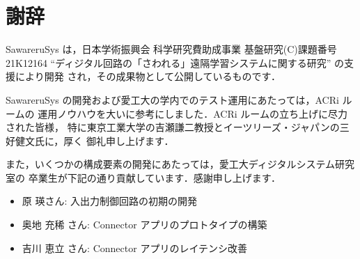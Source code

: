 \chapter*{謝辞}
SawareruSys は，日本学術振興会 科学研究費助成事業 基盤研究(C)課題番号 21K12164 
``ディジタル回路の「さわれる」遠隔学習システムに関する研究'' の支援により開発
され，その成果物として公開しているものです．

SawareruSys の開発および愛工大の学内でのテスト運用にあたっては，ACRi ルームの
運用ノウハウを大いに参考にしました．ACRi ルームの立ち上げに尽力された皆様，
特に東京工業大学の吉瀬謙二教授とイーツリーズ・ジャパンの三好健文氏に，厚く
御礼申し上げます．

また，いくつかの構成要素の開発にあたっては，愛工大ディジタルシステム研究室の
卒業生が下記の通り貢献しています．感謝申し上げます．

\begin{itemize}
 \item 原 瑛さん: 入出力制御回路の初期の開発
 \item 奥地 充稀 さん: Connector アプリのプロトタイプの構築
 \item 吉川 恵立 さん: Connector アプリのレイテンシ改善
\end{itemize}

